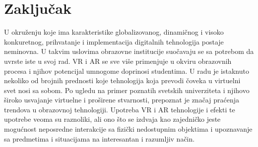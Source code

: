 \documentclass[a4paper]{article}
\begin{document}
	\section{Zaključak}
	\label{sec:Zaključak}
	U okruženju koje ima karakteristike globalizovanog, dinamičnog i visoko  konkuretnog, prihvatanje i implementacija digitalnih 
	tehnologija postaje neminovna. U takvim uslovima obrazovne institucije suočavaju se sa potrebom da uvrste iste u svoj rad. VR i AR se sve više primenjuje
	u okviru obrazovnih procesa i njihov potencijal umnogome doprinosi studentima. U radu je istaknuto nekoliko od brojnih prednosti koje tehnologija koja prevodi
	čoveka u virtuelni svet nosi sa sobom. Po ugledu na primer poznatih svetskih univerziteta i njihovo široko usvajanje virtuelne i proširene stvarnosti, prepoznat 
	je značaj praćenja trendova u obrazovnoj tehnologiji. Upotreba VR i AR tehnologije i efekti te upotrebe veoma su raznoliki, ali ono što se izdvaja kao zajedničko 
	jeste mogućnost neposredne interakcije sa fizički nedostupnim objektima i upoznavanje sa predmetima i situacijama na interesantan i razumljiv način.
\end{document}
